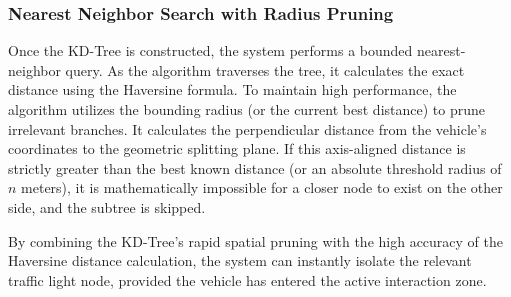 \subsubsection{Nearest Neighbor Search with Radius Pruning}
Once the KD-Tree is constructed, the system performs a bounded nearest-neighbor query. As the algorithm traverses the tree, it calculates the exact distance using the Haversine formula. To maintain high performance, the algorithm utilizes the bounding radius (or the current best distance) to prune irrelevant branches. It calculates the perpendicular distance from the vehicle's coordinates to the geometric splitting plane. If this axis-aligned distance is strictly greater than the best known distance (or an absolute threshold radius of $n$ meters), it is mathematically impossible for a closer node to exist on the other side, and the subtree is skipped.

\begin{algorithm}[H]
\caption{Find Nearest Node with Haversine and Pruning}
\label{alg:find_nearest}
\end{algorithm}

By combining the KD-Tree's rapid spatial pruning with the high accuracy of the Haversine distance calculation, the system can instantly isolate the relevant traffic light node, provided the vehicle has entered the active interaction zone.
